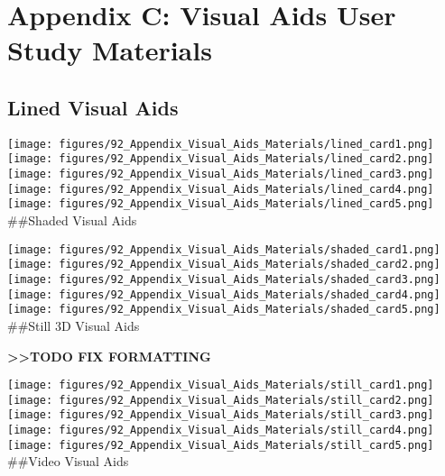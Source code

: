 \section{Appendix C: Visual Aids User Study
Materials}\label{appendix-c-visual-aids-user-study-materials}

\subsection{Lined Visual Aids}\label{lined-visual-aids}

\texttt{[image: figures/92\_Appendix\_Visual\_Aids\_Materials/lined\_card1.png]}\\\texttt{[image: figures/92\_Appendix\_Visual\_Aids\_Materials/lined\_card2.png]}\\\texttt{[image: figures/92\_Appendix\_Visual\_Aids\_Materials/lined\_card3.png]}\\\texttt{[image: figures/92\_Appendix\_Visual\_Aids\_Materials/lined\_card4.png]}\\\texttt{[image: figures/92\_Appendix\_Visual\_Aids\_Materials/lined\_card5.png]}\\
\#\#Shaded Visual Aids

\texttt{[image: figures/92\_Appendix\_Visual\_Aids\_Materials/shaded\_card1.png]}\\\texttt{[image: figures/92\_Appendix\_Visual\_Aids\_Materials/shaded\_card2.png]}\\\texttt{[image: figures/92\_Appendix\_Visual\_Aids\_Materials/shaded\_card3.png]}\\\texttt{[image: figures/92\_Appendix\_Visual\_Aids\_Materials/shaded\_card4.png]}\\\texttt{[image: figures/92\_Appendix\_Visual\_Aids\_Materials/shaded\_card5.png]}\\
\#\#Still 3D Visual Aids

\textbf{\textgreater{}\textgreater{}TODO FIX FORMATTING}

\texttt{[image: figures/92\_Appendix\_Visual\_Aids\_Materials/still\_card1.png]}\\\texttt{[image: figures/92\_Appendix\_Visual\_Aids\_Materials/still\_card2.png]}\\\texttt{[image: figures/92\_Appendix\_Visual\_Aids\_Materials/still\_card3.png]}\\\texttt{[image: figures/92\_Appendix\_Visual\_Aids\_Materials/still\_card4.png]}\\\texttt{[image: figures/92\_Appendix\_Visual\_Aids\_Materials/still\_card5.png]}\\
\#\#Video Visual Aids

